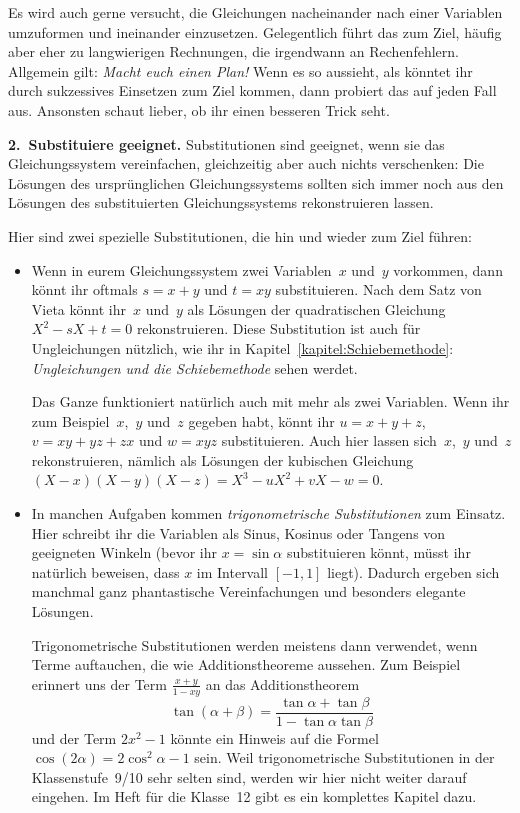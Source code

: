 Es wird auch gerne versucht, die Gleichungen nacheinander nach einer Variablen umzuformen und ineinander einzusetzen. Gelegentlich führt das zum Ziel, häufig aber eher zu langwierigen Rechnungen, die irgendwann an Rechenfehlern. Allgemein gilt: \emph{Macht euch einen Plan!} Wenn es so aussieht, als könntet ihr durch sukzessives Einsetzen zum Ziel kommen, dann probiert das auf jeden Fall aus. Ansonsten schaut lieber, ob ihr einen besseren Trick seht.

\textbf{2.~Substituiere geeignet.} Substitutionen sind geeignet, wenn sie das Gleichungssystem vereinfachen, gleichzeitig aber auch nichts verschenken: Die Lösungen des ursprünglichen Gleichungssystems sollten sich immer noch aus den Lösungen des substituierten Gleichungssystems rekonstruieren lassen.

Hier sind zwei spezielle Substitutionen, die hin und wieder zum Ziel führen:
\begin{itemize}
	\item Wenn in eurem Gleichungssystem zwei Variablen~$x$ und~$y$ vorkommen, dann könnt ihr oftmals $s=x+y$ und $t=xy$ substituieren. Nach dem Satz von Vieta könnt ihr~$x$ und~$y$ als Lösungen der quadratischen Gleichung $X^2-sX+t=0$ rekonstruieren. Diese Substitution ist auch für Ungleichungen nützlich, wie ihr in Kapitel~\ref{kapitel:Schiebemethode}: \emph{Ungleichungen und die Schiebemethode} sehen werdet.
	
	Das Ganze funktioniert natürlich auch mit mehr als zwei Variablen. Wenn ihr zum Beispiel~$x$,~$y$ und~$z$ gegeben habt, könnt ihr $u=x+y+z$, $v=xy+yz+zx$ und $w=xyz$ substituieren. Auch hier lassen sich~$x$,~$y$ und~$z$ rekonstruieren, nämlich als Lösungen der kubischen Gleichung $(X-x)(X-y)(X-z)=X^3-uX^2+vX-w=0$.
	
	\item In manchen Aufgaben kommen \emph{trigonometrische Substitutionen} zum Einsatz. Hier schreibt ihr die Variablen als Sinus, Kosinus oder Tangens von geeigneten Winkeln (bevor ihr $x=\sin\alpha$ substituieren könnt, müsst ihr natürlich beweisen, dass $x$ im Intervall $[-1,1]$ liegt). Dadurch ergeben sich manchmal ganz phantastische Vereinfachungen und besonders elegante Lösungen.
	
	Trigonometrische Substitutionen werden meistens dann verwendet, wenn Terme auftauchen, die wie Additionstheoreme aussehen. Zum Beispiel erinnert uns der Term $\frac{x+y}{1-xy}$ an das Additionstheorem 
	\begin{equation*}
		\tan(\alpha+\beta)=\frac{\tan\alpha+\tan\beta}{1-\tan\alpha\tan\beta}
	\end{equation*}
	und der Term $2x^2-1$ könnte ein Hinweis auf die Formel $\cos(2\alpha)=2\cos^2\alpha-1$ sein. Weil trigonometrische Substitutionen in der Klassenstufe~9/10 sehr selten sind, werden wir hier nicht weiter darauf eingehen. Im Heft für die Klasse~12 gibt es ein komplettes Kapitel dazu.
\end{itemize}

